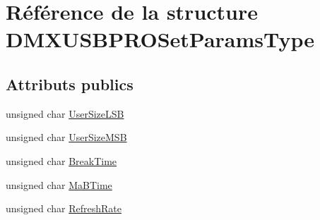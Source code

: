 \hypertarget{struct_d_m_x_u_s_b_p_r_o_set_params_type}{\section{Référence de la structure D\-M\-X\-U\-S\-B\-P\-R\-O\-Set\-Params\-Type}
\label{struct_d_m_x_u_s_b_p_r_o_set_params_type}
}
\subsection*{Attributs publics}
\begin{DoxyCompactItemize}
\item 
unsigned char \hyperlink{struct_d_m_x_u_s_b_p_r_o_set_params_type_a849e4ebeb6ebb38a6b2fc53c32d4456d}{User\-Size\-L\-S\-B}
\item 
unsigned char \hyperlink{struct_d_m_x_u_s_b_p_r_o_set_params_type_adae7671559ec6924d03fd27f50d6fda0}{User\-Size\-M\-S\-B}
\item 
unsigned char \hyperlink{struct_d_m_x_u_s_b_p_r_o_set_params_type_ad5a0ccbc024303300f2933f16046abd4}{Break\-Time}
\item 
unsigned char \hyperlink{struct_d_m_x_u_s_b_p_r_o_set_params_type_a766ed7ac1cd093a822fa905f43f81129}{Ma\-B\-Time}
\item 
unsigned char \hyperlink{struct_d_m_x_u_s_b_p_r_o_set_params_type_a1e0b6924aa027f23f1bbd5606cbe09e7}{Refresh\-Rate}
\end{DoxyCompactItemize}


